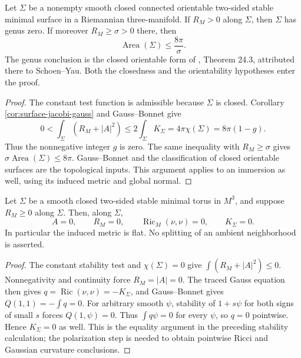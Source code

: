 \begin{theorem}\label{thm:stable-surface-positive-scalar}
Let $\Sigma$ be a nonempty smooth closed connected orientable two-sided stable minimal surface in a Riemannian three-manifold. If $R_M>0$ along $\Sigma$, then $\Sigma$ has genus zero. If moreover $R_M\geq\sigma>0$ there, then
\[
 \operatorname{Area}(\Sigma)\leq\frac{8\pi}{\sigma}.
\]
The genus conclusion is the closed orientable form of \cite{ChMin}, Theorem 24.3, attributed there to Schoen--Yau. Both the closedness and the orientability hypotheses enter the proof.
\end{theorem}
\begin{proof}
The constant test function is admissible because $\Sigma$ is closed. Corollary \ref{cor:surface-jacobi-gauss} and Gauss--Bonnet give
\[
 0<\int_\Sigma(R_M+|A|^2)
 \leq2\int_\Sigma K_\Sigma
 =4\pi\chi(\Sigma)=8\pi(1-g).
\]
Thus the nonnegative integer $g$ is zero. The same inequality with $R_M\geq\sigma$ gives $\sigma\operatorname{Area}(\Sigma)\leq8\pi$. Gauss--Bonnet and the classification of closed orientable surfaces are the topological inputs. This argument applies to an immersion as well, using its induced metric and global normal.
\end{proof}

\begin{proposition}\label{prop:stable-torus-rigidity}
Let $\Sigma$ be a smooth closed two-sided stable minimal torus in $M^3$, and suppose $R_M\geq0$ along $\Sigma$. Then, along $\Sigma$,
\[
 A=0,\qquad R_M=0,\qquad
 \operatorname{Ric}_M(\nu,\nu)=0,\qquad K_\Sigma=0.
\]
In particular the induced metric is flat. No splitting of an ambient neighborhood is asserted.
\end{proposition}
\begin{proof}
The constant stability test and $\chi(\Sigma)=0$ give $\int(R_M+|A|^2)\leq0$. Nonnegativity and continuity force $R_M=|A|=0$. The traced Gauss equation then gives $q=\operatorname{Ric}(\nu,\nu)=-K_\Sigma$, and Gauss--Bonnet gives $Q(1,1)=-\int q=0$. For arbitrary smooth $\psi$, stability of $1+s\psi$ for both signs of small $s$ forces $Q(1,\psi)=0$. Thus $\int q\psi=0$ for every $\psi$, so $q=0$ pointwise. Hence $K_\Sigma=0$ as well. This is the equality argument in the preceding stability calculation; the polarization step is needed to obtain pointwise Ricci and Gaussian curvature conclusions.
\end{proof}

